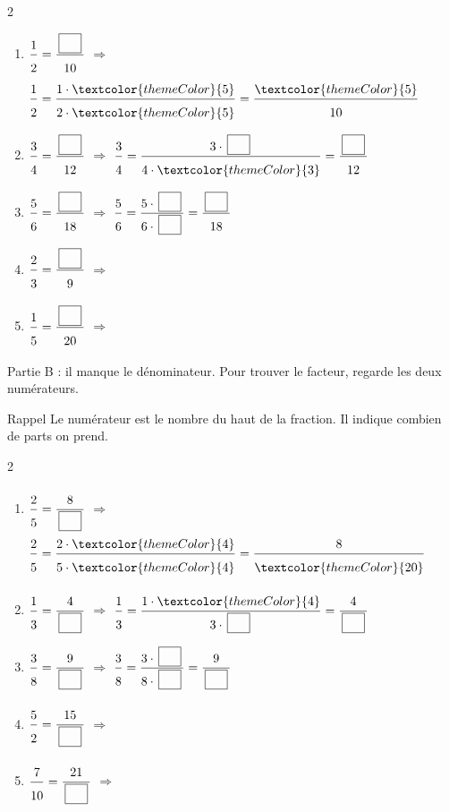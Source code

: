 \begin{multicols}{2}
\begin{enumerate}[leftmargin=*,align=parleft, label=\alph*), itemsep=9pt]
\item $\FA{1}{2}=\FA{\CaseC}{10}$ \quad $\Longrightarrow$ \quad $\FA{1}{2}=\FA{1 \cdot \textcolor{themeColor}{5}}{2 \cdot \textcolor{themeColor}{5}}=\FA{\textcolor{themeColor}{5}}{10}$
\item $\FA{3}{4}=\FA{\CaseC}{12}$ \quad $\Longrightarrow$ \quad $\FA{3}{4}=\FA{3 \cdot \CaseC}{4 \cdot \textcolor{themeColor}{3}}=\FA{\CaseC}{12}$
\item $\FA{5}{6}=\FA{\CaseC}{18}$ \quad $\Longrightarrow$ \quad $\FA{5}{6}=\FA{5 \cdot \CaseC}{6 \cdot \CaseC}=\FA{\CaseC}{18}$
\item $\FA{2}{3}=\FA{\CaseC}{9}$ \quad $\Longrightarrow$
\item $\FA{1}{5}=\FA{\CaseC}{20}$ \quad $\Longrightarrow$
\end{enumerate}
\end{multicols}

\newpage
\textcolor{themeColor}{Partie B} : il manque le dénominateur. Pour trouver le facteur, regarde les deux numérateurs.

\vspace{10pt}\begin{astuce}{Rappel}
Le \textcolor{themeColor}{numérateur} est le nombre du haut de la fraction. Il indique combien de parts on prend.
\end{astuce}\vspace{15pt}

\begin{multicols}{2}
\begin{enumerate}[leftmargin=*,align=parleft, label=\alph*), itemsep=9pt, start=6]
\item $\FA{2}{5}=\FA{8}{\CaseC}$ \quad $\Longrightarrow$ \quad $\FA{2}{5}=\FA{2 \cdot \textcolor{themeColor}{4}}{5 \cdot \textcolor{themeColor}{4}}=\FA{8}{\textcolor{themeColor}{20}}$
\item $\FA{1}{3}=\FA{4}{\CaseC}$ \quad $\Longrightarrow$ \quad $\FA{1}{3}=\FA{1 \cdot \textcolor{themeColor}{4}}{3 \cdot \CaseC}=\FA{4}{\CaseC}$
\item $\FA{3}{8}=\FA{9}{\CaseC}$ \quad $\Longrightarrow$ \quad $\FA{3}{8}=\FA{3 \cdot \CaseC}{8 \cdot \CaseC}=\FA{9}{\CaseC}$
\item $\FA{5}{2}=\FA{15}{\CaseC}$ \quad $\Longrightarrow$
\item $\FA{7}{10}=\FA{21}{\CaseC}$ \quad $\Longrightarrow$
\end{enumerate}
\end{multicols}

